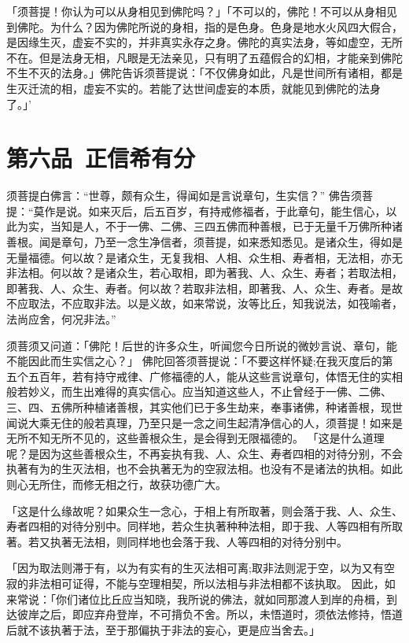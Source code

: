 \documentclass[12pt,twoside,openany]{book}
\newcommand{\kai}[1]{{\CJKfamily{kai}#1}}
\begin{document}
\kai{「须菩提！你认为可以从身相见到佛陀吗？」「不可以的，佛陀！不可以从身相见到佛陀。为什么？因为佛陀所说的身相，指的是色身。色身是地水火风四大假合，是因缘生灭，虚妄不实的，并非真实永存之身。佛陀的真实法身，等如虚空，无所不在。但是法身无相，凡眼是无法亲见，只有明了五蕴假合的幻相，才能亲到佛陀不生不灭的法身。」佛陀告诉须菩提说：「不仅佛身如此，凡是世间所有诸相，都是生灭迁流的相，虚妄不实的。若能了达世间虚妄的本质，就能见到佛陀的法身了。」’}

\chapter{第六品\ 正信希有分}
\begin{pinyinscope}
须菩提白佛言：“世尊，颇有众生，得闻如是言说章句，生实信？” 佛告须菩提：“莫作是说。如来灭后，后五百岁，有持戒修福者，于此章句，能生信心，以此为实，当知是人，不于一佛、二佛、三四五佛而种善根，已于无量千万佛所种诸善根。闻是章句，乃至一念生净信者，须菩提，如来悉知悉见。是诸众生，得如是无量福德。何以故？{\color{red}是诸众生，无复我相、人相、众生相、寿者相，无法相，亦无非法相。}何以故？是诸众生，若心取相，即为著我、人、众生、寿者；若取法相，即著我、人、众生、寿者。何以故？若取非法相，即著我、人、众生、寿者。是故不应取法，不应取非法。以是义故，如来常说，汝等比丘，知我说法，如筏喻者，法尚应舍，何况非法。”
\end{pinyinscope}

\kai{须菩须又问道：「佛陀！后世的许多众生，听闻您今日所说的微妙言说、章句，能不能因此而生实信之心？」 佛陀回答须菩提说：「不要这样怀疑;在我灭度后的第五个五百年，若有持守戒律、广修福德的人，能从这些言说章句，体悟无住的实相般若妙义，而生出难得的真实信心。应当知道这些人，不止曾经于一佛、二佛、三、四、五佛所种植诸善根，其实他们已于多生劫来，奉事诸佛，种诸善根，现世闻说大乘无住的般若真理，乃至只是一念之间生起清净信心的人，须菩提！如来是无所不知无所不见的，这些善根众生，是会得到无限福德的。 「这是什么道理呢？是因为这些善根众生，不再妄执有我、人、众生、寿者四相的对待分别，不会执著有为的生灭法相，也不会执著无为的空寂法相。也没有不是诸法的执相。如此则心无所住，而修无相之行，故获功德广大。
	
	「这是什么缘故呢？如果众生一念心，于相上有所取著，则会落于我、人、众生、寿者四相的对待分别中。同样地，若众生执著种种法相，即于我、人等四相有所取著。若又执著无法相，则同样地也会落于我、人等四相的对待分别中。
	
	「因为取法则滞于有，以为有实有的生灭法相可离;取非法则泥于空，以为又有空寂的非法相可证得，不能与空理相契，所以法相与非法相都不该执取。 因此，如来常说：「你们诸位比丘应当知晓，我所说的佛法，就如同那渡人到岸的舟楫，到达彼岸之后，即应弃舟登岸，不可揹负不舍。所以，未悟道时，须依法修持，悟道后就不该执著于法，至于那偏执于非法的妄心，更是应当舍去。」}
\end{document}
